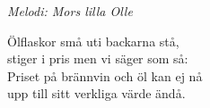 {\footnotesize\textit{Melodi: Mors lilla Olle}}\par
\vspace{10pt}
Ölflaskor små uti backarna stå,\\
stiger i pris men vi säger som så:\\
Priset på brännvin och öl kan ej nå\\
upp till sitt verkliga värde ändå.
